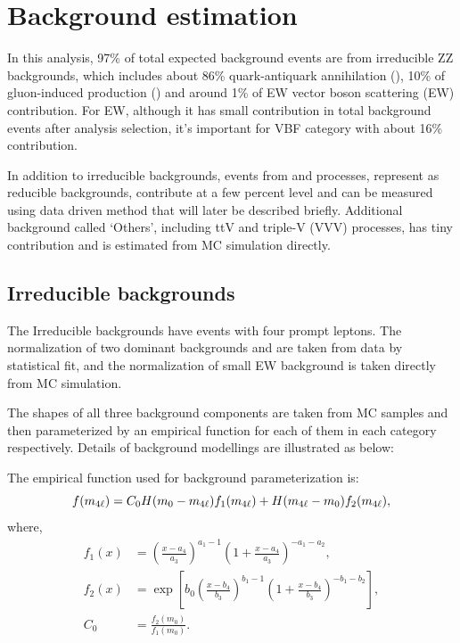 \section{Background estimation}
\label{sec:hmhzz_bkg}

In this analysis, 97\% of total expected background events are from irreducible ZZ backgrounds, which includes about 86\% quark-antiquark annihilation (\qqZZ), 10\% of gluon-induced production (\ggZZ) and around 1\% of EW vector boson scattering (\qqZZ EW) contribution.
For \qqZZ EW, although it has small contribution in total background events after analysis selection, it's important for VBF category with about 16\% contribution.

In addition to irreducible backgrounds, events from \Zjet and \ttbar processes, represent as reducible backgrounds, contribute at a few percent level and can be measured using data driven method that will later be described briefly.
Additional background called `Others', including ttV and triple-V (VVV) processes, has tiny contribution and is estimated from MC simulation directly.

\subsection{Irreducible backgrounds}
The Irreducible backgrounds have events with four prompt leptons.
The normalization of two dominant backgrounds \qqZZ and \ggZZ are taken from data by statistical fit, and the normalization of small \qqZZ EW background is taken directly from MC simulation.

The \mfl shapes of all three background components are taken from MC samples and then parameterized by an empirical function for each of them in each category respectively.
Details of background modellings are illustrated as below:

The empirical function used for background parameterization is:
\begin{equation}
    f(m_{4\ell}) = C_0 H(m_{0} - m_{4\ell}) f_{1}(m_{4\ell}) + H(m_{4\ell} - m_{0}) f_{2}(m_{4\ell}),
    \label{eq:bkg_model}
\end{equation}
where,
\begin{align*}
    f_1(x) &= \left( \frac{x - a_4}{a_3} \right)^{a_1 - 1} \left( 1 + \frac{x - a_4}{a_3} \right)^{-a_1 - a_2}, \\
    f_2(x) &= \exp \left[ b_0 \left( \frac{x - b_4}{b_3} \right)^{b_1 - 1} \left( 1 + \frac{x - b_4}{b_3} \right)^{-b_1 - b_2} \right], \\
    C_0    &= \frac{f_{2} (m_0)} {f_{1} (m_0)}.
    \label{eq:bkg_model_full}
\end{align*}

